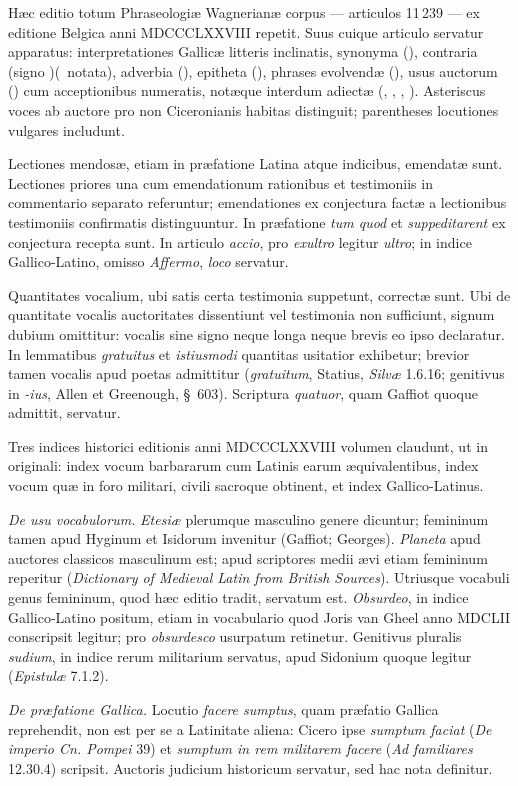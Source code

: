 \thispagestyle{plain}

Hæc editio totum Phraseologiæ Wagnerianæ corpus --- articulos 11\,239
--- ex editione Belgica anni MDCCCLXXVIII repetit. Suus cuique articulo
servatur apparatus: interpretationes Gallicæ litteris
inclinatis, synonyma (), contraria (signo \mbox{)(}\,
notata), adverbia (), epitheta (),
phrases evolvendæ (), usus auctorum
() cum acceptionibus numeratis, notæque interdum
adiectæ (, , ,
). Asteriscus voces ab auctore pro non Ciceronianis
habitas distinguit; parentheses locutiones vulgares includunt.

Lectiones mendosæ, etiam in præfatione Latina atque indicibus,
emendatæ sunt. Lectiones priores una cum emendationum rationibus et
testimoniis in commentario separato referuntur; emendationes ex
conjectura factæ a lectionibus testimoniis confirmatis distinguuntur.
In præfatione \textit{tum quod} et \textit{suppeditarent} ex conjectura
recepta sunt. In articulo \textit{accio}, pro \textit{exultro} legitur
\textit{ultro}; in indice Gallico-Latino, omisso \textit{Affermo},
\textit{loco} servatur.

Quantitates vocalium, ubi satis certa testimonia suppetunt, correctæ
sunt. Ubi de quantitate vocalis auctoritates dissentiunt vel
testimonia non sufficiunt, signum dubium omittitur: vocalis sine
signo neque longa neque brevis eo ipso declaratur. In lemmatibus
\textit{gratuitus} et \textit{istiusmodi} quantitas usitatior exhibetur;
brevior tamen vocalis apud poetas admittitur (\textit{gratuitum},
Statius, \textit{Silvæ} 1.6.16; genitivus in \textit{-ius}, Allen et
Greenough, \S~603). Scriptura \textit{quatuor}, quam Gaffiot quoque
admittit, servatur.

Tres indices historici editionis anni MDCCCLXXVIII volumen claudunt,
ut in originali: index vocum barbararum cum Latinis earum
æquivalentibus, index vocum quæ in foro militari, civili sacroque
obtinent, et index Gallico-Latinus.

\medskip
\noindent\textit{De usu vocabulorum.}
\textit{Etesiæ} plerumque masculino genere dicuntur; femininum tamen
apud Hyginum et Isidorum invenitur (Gaffiot; Georges).
\textit{Planeta} apud auctores classicos masculinum est; apud scriptores
medii ævi etiam femininum reperitur (\textit{Dictionary of Medieval
Latin from British Sources}). Utriusque vocabuli genus femininum,
quod hæc editio tradit, servatum est.
\textit{Obsurdeo}, in indice Gallico-Latino positum, etiam in
vocabulario quod Joris van Gheel anno MDCLII conscripsit legitur;
pro \textit{obsurdesco} usurpatum retinetur.
Genitivus pluralis \textit{sudium}, in indice rerum militarium
servatus, apud Sidonium quoque legitur (\textit{Epistulæ} 7.1.2).

\medskip
\noindent\textit{De præfatione Gallica.}
Locutio \textit{facere sumptus}, quam præfatio Gallica reprehendit,
non est per se a Latinitate aliena: Cicero ipse \textit{sumptum faciat}
(\textit{De imperio Cn. Pompei} 39) et \textit{sumptum in rem militarem
facere} (\textit{Ad familiares} 12.30.4) scripsit. Auctoris judicium
historicum servatur, sed hac nota definitur.
\vspace{1.5pc}
